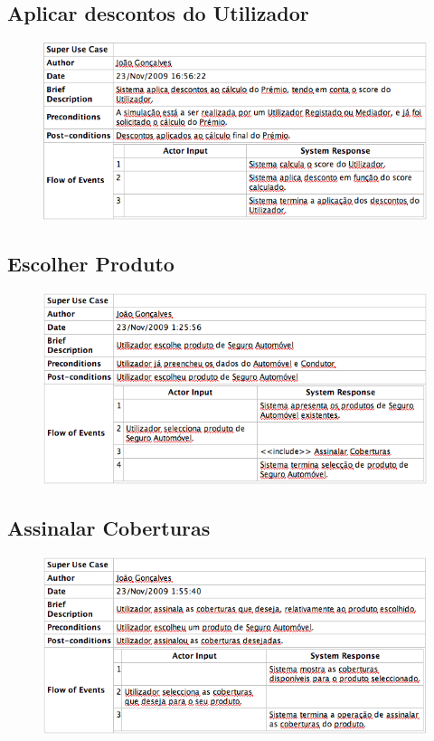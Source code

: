 \subsection{Aplicar descontos do Utilizador}
\begin{figure}[!htb]
	\centering
	\includegraphics[scale=0.7]{images/Prints/RealizacaoSeguroAutomovel/AplicarDescontosUtilizador.png}
\end{figure}

\pagebreak

\subsection{Escolher Produto}
\begin{figure}[!htb]
	\centering
	\includegraphics[scale=0.7]{images/Prints/RealizacaoSeguroAutomovel/EscolherProduto.png}
\end{figure}

\subsection{Assinalar Coberturas}
\begin{figure}[!htb]
	\centering
	\includegraphics[scale=0.7]{images/Prints/RealizacaoSeguroAutomovel/AssinalarCoberturas.png}
\end{figure}

